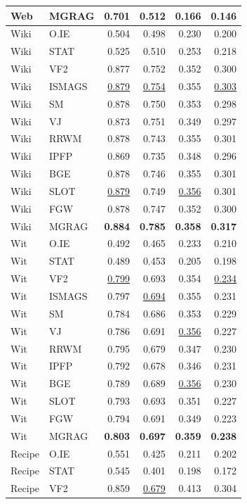 {\begin{longtable}{llrrrr}
Web & MGRAG & \textbf{0.701} & \textbf{0.512} & \textbf{0.166} & \textbf{0.146} \\
\midrule
Wiki & O.IE & 0.504 & 0.498 & 0.230 & 0.200 \\
Wiki & STAT & 0.525 & 0.510 & 0.253 & 0.218 \\
Wiki & VF2 & 0.877 & 0.752 & 0.352 & 0.300 \\
Wiki & ISMAGS & \underline{0.879} & \underline{0.754} & 0.355 & \underline{0.303} \\
Wiki & SM & 0.878 & 0.750 & 0.353 & 0.298 \\
Wiki & VJ & 0.873 & 0.751 & 0.349 & 0.297 \\
Wiki & RRWM & 0.878 & 0.743 & 0.355 & 0.301 \\
Wiki & IPFP & 0.869 & 0.735 & 0.348 & 0.296 \\
Wiki & BGE & 0.878 & 0.746 & 0.355 & 0.301 \\
Wiki & SLOT & \underline{0.879} & 0.749 & \underline{0.356} & 0.301 \\
Wiki & FGW & 0.878 & 0.747 & 0.352 & 0.300 \\
Wiki & MGRAG & \textbf{0.884} & \textbf{0.785} & \textbf{0.358} & \textbf{0.317} \\
\midrule
Wit & O.IE & 0.492 & 0.465 & 0.233 & 0.210 \\
Wit & STAT & 0.489 & 0.453 & 0.205 & 0.198 \\
Wit & VF2 & \underline{0.799} & 0.693 & 0.354 & \underline{0.234} \\
Wit & ISMAGS & 0.797 & \underline{0.694} & 0.355 & 0.231 \\
Wit & SM & 0.784 & 0.686 & 0.353 & 0.229 \\
Wit & VJ & 0.786 & 0.691 & \underline{0.356} & 0.227 \\
Wit & RRWM & 0.795 & 0.679 & 0.347 & 0.230 \\
Wit & IPFP & 0.792 & 0.678 & 0.346 & 0.231 \\
Wit & BGE & 0.789 & 0.689 & \underline{0.356} & 0.230 \\
Wit & SLOT & 0.793 & 0.693 & 0.351 & 0.227 \\
Wit & FGW & 0.794 & 0.691 & 0.349 & 0.223 \\
Wit & MGRAG & \textbf{0.803} & \textbf{0.697} & \textbf{0.359} & \textbf{0.238} \\
\midrule
Recipe & O.IE & 0.551 & 0.425 & 0.211 & 0.202 \\
Recipe & STAT & 0.545 & 0.401 & 0.198 & 0.172 \\
Recipe & VF2 & 0.859 & \underline{0.679} & 0.413 & 0.304 \\

\end{longtable}}

